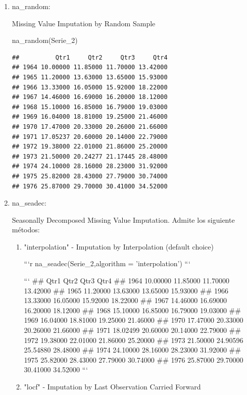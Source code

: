 \documentclass[
]{article}
\newenvironment{Shaded}{\begin{snugshade}}{\end{snugshade}}
\newcommand{\FunctionTok}[1]{\textcolor[rgb]{0.00,0.00,0.00}{#1}}
\newcommand{\NormalTok}[1]{#1}
\begin{document}
\begin{enumerate}
\item

na\_random:

Missing Value Imputation by Random Sample

\begin{Shaded}
\begin{Highlighting}[]
\FunctionTok{na\_random}\NormalTok{(Serie\_2)}
\end{Highlighting}
\end{Shaded}

\begin{verbatim}
##          Qtr1     Qtr2     Qtr3     Qtr4
## 1964 10.00000 11.85000 11.70000 13.42000
## 1965 11.20000 13.63000 13.65000 15.93000
## 1966 13.33000 16.05000 15.92000 18.22000
## 1967 14.46000 16.69000 16.20000 18.12000
## 1968 15.10000 16.85000 16.79000 19.03000
## 1969 16.04000 18.81000 19.25000 21.46000
## 1970 17.47000 20.33000 20.26000 21.66000
## 1971 17.05237 20.60000 20.14000 22.79000
## 1972 19.38000 22.01000 21.86000 25.20000
## 1973 21.50000 20.24277 21.17445 28.48000
## 1974 24.10000 28.16000 28.23000 31.92000
## 1975 25.82000 28.43000 27.79000 30.74000
## 1976 25.87000 29.70000 30.41000 34.52000
\end{verbatim}

\item

na\_seadec:

Seasonally Decomposed Missing Value Imputation. Admite los siguiente
métodos:

\begin{enumerate}
\item "interpolation" - Imputation by Interpolation (default choice)

```r
na_seadec(Serie_2,algorithm = 'interpolation')
```

```
##          Qtr1     Qtr2     Qtr3     Qtr4
## 1964 10.00000 11.85000 11.70000 13.42000
## 1965 11.20000 13.63000 13.65000 15.93000
## 1966 13.33000 16.05000 15.92000 18.22000
## 1967 14.46000 16.69000 16.20000 18.12000
## 1968 15.10000 16.85000 16.79000 19.03000
## 1969 16.04000 18.81000 19.25000 21.46000
## 1970 17.47000 20.33000 20.26000 21.66000
## 1971 18.02499 20.60000 20.14000 22.79000
## 1972 19.38000 22.01000 21.86000 25.20000
## 1973 21.50000 24.90596 25.54880 28.48000
## 1974 24.10000 28.16000 28.23000 31.92000
## 1975 25.82000 28.43000 27.79000 30.74000
## 1976 25.87000 29.70000 30.41000 34.52000
```

\item "locf" - Imputation by Last Observation Carried Forward


\end{enumerate}
\end{enumerate}
\end{document}
